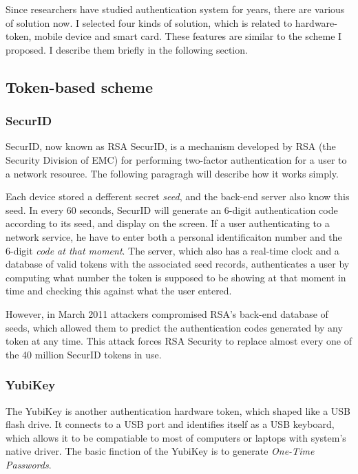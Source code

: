 \begin{CJK}{Bg5}{bsmi}
Since researchers have studied authentication system for years, there are various of solution now. I selected four kinds of solution, which is related to hardware-token, mobile device and smart card. These features are similar to the scheme I proposed. I describe them briefly in the following section.

\subsection{Token-based scheme}

\subsubsection{SecurID}

SecurID, now known as RSA SecurID\cite{rsa-securid}, is a mechanism developed by RSA (the Security Division of EMC) for performing two-factor authentication for a user to a network resource. The following paragragh will describe how it works simply.

Each device stored a defferent secret \emph{seed}, and the back-end server also know this seed. In every 60 seconds, SecurID will generate an 6-digit authentication code according to its seed, and display on the screen. If a user authenticating to a network service, he have to enter both a personal identificaiton number and the 6-digit \emph{code at that moment}. The server, which also has a real-time clock and a database of valid tokens with the associated seed records, authenticates a user by computing what number the token is supposed to be showing at that moment in time and checking this against what the user entered.

However, in March 2011 attackers compromised RSA's back-end database of seeds, which allowed them to predict the authentication codes generated by any token at any time. This attack forces RSA Security to replace almost every one of the 40 million SecurID tokens in use.

\subsubsection{YubiKey}

The YubiKey\cite{yubikey} is another authentication hardware token, which shaped like a USB flash drive. It connects to a USB port and identifies itself as a USB keyboard, which allows it to be compatiable to most of computers or laptops with system's native driver. The basic finction of the YubiKey is to generate \emph{One-Time Passwords}. 


\end{CJK}
